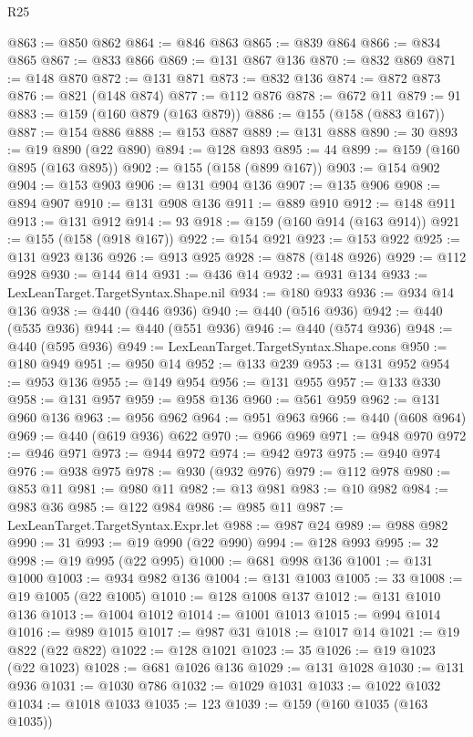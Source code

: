 \begin{lexlean}{R25}
\begin{coremodule}
@863 := @850 @862
@864 := @846 @863
@865 := @839 @864
@866 := @834 @865
@867 := @833 @866
@869 := @131 @867 @136
@870 := @832 @869
@871 := @148 @870
@872 := @131 @871
@873 := @832 @136
@874 := @872 @873
@876 := @821 (@148 @874)
@877 := @112 @876
@878 := @672 @11
@879 := 91
@883 := @159 (@160 @879 (@163 @879))
@886 := @155 (@158 (@883 @167))
@887 := @154 @886
@888 := @153 @887
@889 := @131 @888
@890 := 30
@893 := @19 @890 (@22 @890)
@894 := @128 @893
@895 := 44
@899 := @159 (@160 @895 (@163 @895))
@902 := @155 (@158 (@899 @167))
@903 := @154 @902
@904 := @153 @903
@906 := @131 @904 @136
@907 := @135 @906
@908 := @894 @907
@910 := @131 @908 @136
@911 := @889 @910
@912 := @148 @911
@913 := @131 @912
@914 := 93
@918 := @159 (@160 @914 (@163 @914))
@921 := @155 (@158 (@918 @167))
@922 := @154 @921
@923 := @153 @922
@925 := @131 @923 @136
@926 := @913 @925
@928 := @878 (@148 @926)
@929 := @112 @928
@930 := @144 @14
@931 := @436 @14
@932 := @931 @134
@933 := LexLeanTarget.TargetSyntax.Shape.nil
@934 := @180 @933
@936 := @934 @14 @136
@938 := @440 (@446 @936)
@940 := @440 (@516 @936)
@942 := @440 (@535 @936)
@944 := @440 (@551 @936)
@946 := @440 (@574 @936)
@948 := @440 (@595 @936)
@949 := LexLeanTarget.TargetSyntax.Shape.cons
@950 := @180 @949
@951 := @950 @14
@952 := @133 @239
@953 := @131 @952
@954 := @953 @136
@955 := @149 @954
@956 := @131 @955
@957 := @133 @330
@958 := @131 @957
@959 := @958 @136
@960 := @561 @959
@962 := @131 @960 @136
@963 := @956 @962
@964 := @951 @963
@966 := @440 (@608 @964)
@969 := @440 (@619 @936) @622
@970 := @966 @969
@971 := @948 @970
@972 := @946 @971
@973 := @944 @972
@974 := @942 @973
@975 := @940 @974
@976 := @938 @975
@978 := @930 (@932 @976)
@979 := @112 @978
@980 := @853 @11
@981 := @980 @11
@982 := @13 @981
@983 := @10 @982
@984 := @983 @36
@985 := @122 @984
@986 := @985 @11
@987 := LexLeanTarget.TargetSyntax.Expr.let
@988 := @987 @24
@989 := @988 @982
@990 := 31
@993 := @19 @990 (@22 @990)
@994 := @128 @993
@995 := 32
@998 := @19 @995 (@22 @995)
@1000 := @681 @998 @136
@1001 := @131 @1000
@1003 := @934 @982 @136
@1004 := @131 @1003
@1005 := 33
@1008 := @19 @1005 (@22 @1005)
@1010 := @128 @1008 @137
@1012 := @131 @1010 @136
@1013 := @1004 @1012
@1014 := @1001 @1013
@1015 := @994 @1014
@1016 := @989 @1015
@1017 := @987 @31
@1018 := @1017 @14
@1021 := @19 @822 (@22 @822)
@1022 := @128 @1021
@1023 := 35
@1026 := @19 @1023 (@22 @1023)
@1028 := @681 @1026 @136
@1029 := @131 @1028
@1030 := @131 @936
@1031 := @1030 @786
@1032 := @1029 @1031
@1033 := @1022 @1032
@1034 := @1018 @1033
@1035 := 123
@1039 := @159 (@160 @1035 (@163 @1035))

\end{coremodule}
\end{lexlean}
